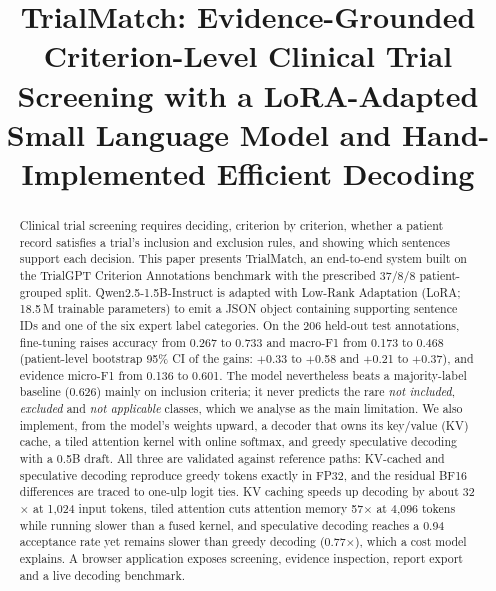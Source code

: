 \documentclass[conference]{IEEEtran}
\begin{document}
\title{TrialMatch: Evidence-Grounded Criterion-Level Clinical Trial Screening with a LoRA-Adapted Small Language Model and Hand-Implemented Efficient Decoding}

\author{
}

\maketitle

\begin{abstract}
Clinical trial screening requires deciding, criterion by criterion, whether a patient record satisfies a trial's inclusion and exclusion rules, and showing which sentences support each decision. This paper presents TrialMatch, an end-to-end system built on the TrialGPT Criterion Annotations benchmark with the prescribed 37/8/8 patient-grouped split. Qwen2.5-1.5B-Instruct is adapted with Low-Rank Adaptation (LoRA; 18.5\,M trainable parameters) to emit a JSON object containing supporting sentence IDs and one of the six expert label categories. On the 206 held-out test annotations, fine-tuning raises accuracy from 0.267 to 0.733 and macro-F1 from 0.173 to 0.468 (patient-level bootstrap 95\% CI of the gains: $+$0.33 to $+$0.58 and $+$0.21 to $+$0.37), and evidence micro-F1 from 0.136 to 0.601. The model nevertheless beats a majority-label baseline (0.626) mainly on inclusion criteria; it never predicts the rare \emph{not included}, \emph{excluded} and \emph{not applicable} classes, which we analyse as the main limitation. We also implement, from the model's weights upward, a decoder that owns its key/value (KV) cache, a tiled attention kernel with online softmax, and greedy speculative decoding with a 0.5B draft. All three are validated against reference paths: KV-cached and speculative decoding reproduce greedy tokens exactly in FP32, and the residual BF16 differences are traced to one-ulp logit ties. KV caching speeds up decoding by about 32$\times$ at 1{,}024 input tokens, tiled attention cuts attention memory 57$\times$ at 4{,}096 tokens while running slower than a fused kernel, and speculative decoding reaches a 0.94 acceptance rate yet remains slower than greedy decoding (0.77$\times$), which a cost model explains. A browser application exposes screening, evidence inspection, report export and a live decoding benchmark.
\end{abstract}
\end{document}
